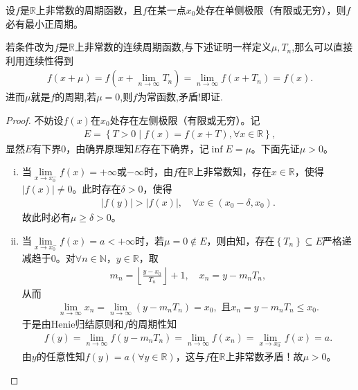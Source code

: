 \documentclass[../../main.tex]{subfiles}%
\begin{document}
\begin{proposition}
设$f$是$\mathbb{R}$上非常数的周期函数，且$f$在某一点$x_0$处存在单侧极限（有限或无穷），则$f$必有最小正周期。
\end{proposition}
\begin{note}
若条件改为$f$是$\mathbb{R}$上非常数的连续周期函数,与下述证明一样定义$\mu,T_n$,那么可以直接利用连续性得到
\begin{align*}
f\left( x+\mu \right) =f\left( x+\underset{n\rightarrow \infty}{\lim}T_n \right) =\underset{n\rightarrow \infty}{\lim}f\left( x+T_n \right) =f\left( x \right) .
\end{align*}
进而$\mu$就是$f$的周期,若$\mu =0$,则$f$为常函数,矛盾!即证.
\end{note}
\begin{proof}
不妨设$f\left( x \right)$在$x_0$处存在左侧极限（有限或无穷）。记
\begin{align*}
E=\left\{ T>0\mid f\left( x \right) =f\left( x+T \right) ,\forall x\in \mathbb{R} \right\},
\end{align*}
显然$E$有下界$0$，由确界原理知$E$存在下确界，记$\inf\limits_{}E=\mu$。下面先证$\mu >0$。

\begin{enumerate}[(i)]
\item 当$\lim\limits_{x\rightarrow x_{0}^{-}}f\left( x \right) =+\infty$或$-\infty$时，由$f$在$\mathbb{R}$上非常数知，存在$x\in \mathbb{R}$，使得$\left| f\left( x \right) \right|\ne 0$。此时存在$\delta >0$，使得
\begin{align*}
\left| f\left( y \right) \right|>\left| f\left( x \right) \right|,\quad \forall x\in \left( x_0-\delta ,x_0 \right) .
\end{align*}
故此时必有$\mu \geqslant \delta >0$。

\item 当$\lim\limits_{x\rightarrow x_{0}^{-}}f\left( x \right) =a<+\infty$时，若$\mu =0\notin E$，则由知，存在$\left\{ T_n \right\} \subseteq E$严格递减趋于$0$。对$\forall n\in \mathbb{N}$，$y\in \mathbb{R}$，取
\begin{align*}
m_n=\left\lfloor \frac{y-x_0}{T_n} \right\rfloor +1,\quad x_n=y-m_nT_n,
\end{align*}
从而
\begin{align*}
\lim\limits_{n\rightarrow \infty}x_n=\lim\limits_{n\rightarrow \infty}\left( y-m_nT_n \right) =x_0,\,\,\text{且}x_n=y-m_nT_n\leqslant x_0.
\end{align*}
于是由Henie归结原则和$f$的周期性知
\begin{align*}
f\left( y \right) =\lim\limits_{n\rightarrow \infty}f\left( y-m_nT_n \right) =\lim\limits_{n\rightarrow \infty}f\left( x_n \right) =\lim\limits_{x\rightarrow x_{0}^{-}}f\left( x \right) =a.
\end{align*}
由$y$的任意性知$f\left( y \right) =a\left( \forall y\in \mathbb{R} \right)$，这与$f$在$\mathbb{R}$上非常数矛盾！故$\mu >0$。
\end{enumerate}


\end{proof}
\end{document}
